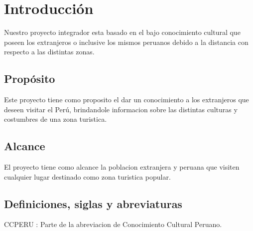 \chapter{Introducción}
Nuestro proyecto integrador esta basado en el bajo conocimiento cultural que poseen los extranjeros o inclusive los mismos peruanos debido a la distancia con respecto a las distintas zonas.
\section{Propósito}
Este proyecto tiene como proposito el dar un conocimiento a los extranjeros que deseen visitar el Perú, brindandole informacion sobre las distintas culturas y costumbres de una zona turistica.
\section{Alcance}
El proyecto tiene como alcance la poblacion extranjera y peruana que visiten cualquier lugar destinado como zona turistica popular.
\section{Definiciones, siglas y abreviaturas}
CCPERU : Parte de la abreviacion de Conocimiento Cultural Peruano.